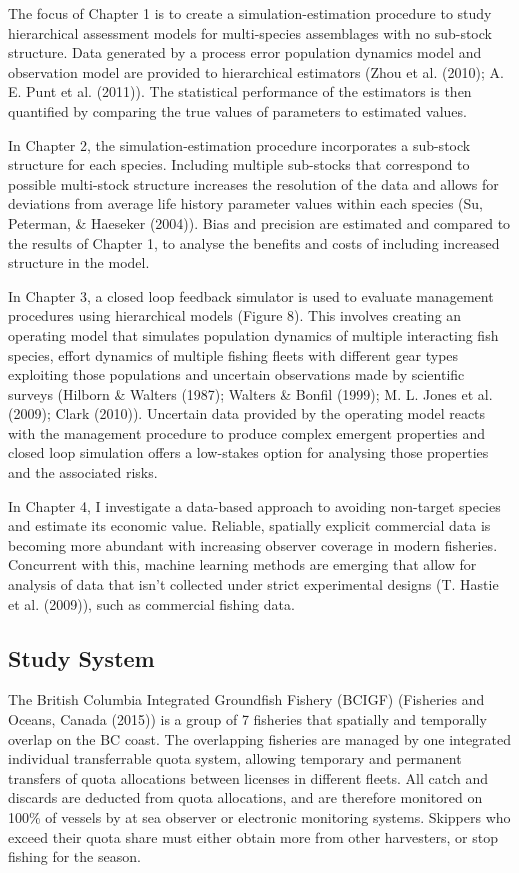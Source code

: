 \documentclass[12pt,]{scrartcl}
\begin{document}
The focus of Chapter 1 is to create a simulation-estimation procedure to
study hierarchical assessment models for multi-species assemblages with
no sub-stock structure. Data generated by a process error population
dynamics model and observation model are provided to hierarchical
estimators (Zhou et al. (2010); A. E. Punt et al. (2011)). The
statistical performance of the estimators is then quantified by
comparing the true values of parameters to estimated values.

In Chapter 2, the simulation-estimation procedure incorporates a
sub-stock structure for each species. Including multiple sub-stocks that
correspond to possible multi-stock structure increases the resolution of
the data and allows for deviations from average life history parameter
values within each species (Su, Peterman, \& Haeseker (2004)). Bias and
precision are estimated and compared to the results of Chapter 1, to
analyse the benefits and costs of including increased structure in the
model.

In Chapter 3, a closed loop feedback simulator is used to evaluate
management procedures using hierarchical models (Figure 8). This
involves creating an operating model that simulates population dynamics
of multiple interacting fish species, effort dynamics of multiple
fishing fleets with different gear types exploiting those populations
and uncertain observations made by scientific surveys (Hilborn \&
Walters (1987); Walters \& Bonfil (1999); M. L. Jones et al. (2009);
Clark (2010)). Uncertain data provided by the operating model reacts
with the management procedure to produce complex emergent properties and
closed loop simulation offers a low-stakes option for analysing those
properties and the associated risks.

In Chapter 4, I investigate a data-based approach to avoiding non-target
species and estimate its economic value. Reliable, spatially explicit
commercial data is becoming more abundant with increasing observer
coverage in modern fisheries. Concurrent with this, machine learning
methods are emerging that allow for analysis of data that isn't
collected under strict experimental designs (T. Hastie et al. (2009)),
such as commercial fishing data.

\subsection{Study System}\label{study-system}

The British Columbia Integrated Groundfish Fishery (BCIGF) (Fisheries
and Oceans, Canada (2015)) is a group of 7 fisheries that spatially and
temporally overlap on the BC coast. The overlapping fisheries are
managed by one integrated individual transferrable quota system,
allowing temporary and permanent transfers of quota allocations between
licenses in different fleets. All catch and discards are deducted from
quota allocations, and are therefore monitored on 100\% of vessels by at
sea observer or electronic monitoring systems. Skippers who exceed their
quota share must either obtain more from other harvesters, or stop
fishing for the season.
\end{document}
